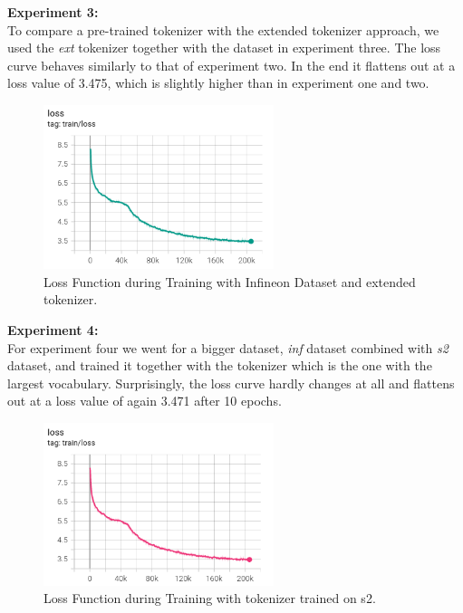 \textbf{Experiment 3:}\\
To compare a pre-trained tokenizer with the extended tokenizer approach, we used the \textit{ext} tokenizer together with the  dataset in experiment three. The loss curve behaves similarly to that of experiment two. In the end it flattens out at a loss value of 3.475, which is slightly higher than in experiment one and two.
\begin{figure}[H]
	\centering
	\includegraphics[width=0.6\textwidth]{figures/loss_inf_ext.png}
	\caption{Loss Function during Training with Infineon Dataset and extended tokenizer.}
	\label{fig:loss_ext}
\end{figure}

\textbf{Experiment 4:}\\
For experiment four we went for a bigger dataset, \textit{inf} dataset combined with \textit{s2} dataset, and trained it together with the tokenizer  which is the one with the largest vocabulary. Surprisingly, the loss curve hardly changes at all and flattens out at a loss value of again 3.471 after 10 epochs.
\begin{figure}[H]
	\centering
	\includegraphics[width=0.6\textwidth]{figures/loss_infs2_s2.png}
	\caption{Loss Function during Training with tokenizer trained on s2.}
	\label{fig:loss_s2}
\end{figure}

